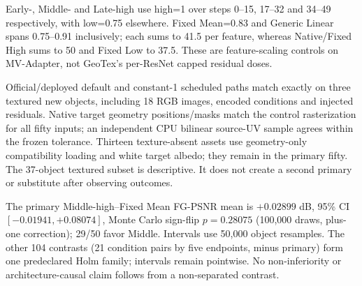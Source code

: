 \documentclass[11pt]{article}
\begin{document}
Early-, Middle- and Late-high use high=1 over steps 0--15, 17--32 and 34--49 respectively, with low=0.75 elsewhere. Fixed Mean=0.83 and Generic Linear spans 0.75--0.91 inclusively; each sums to 41.5 per feature, whereas Native/Fixed High sums to 50 and Fixed Low to 37.5. These are feature-scaling controls on MV-Adapter, not GeoTex's per-ResNet capped residual doses.

Official/deployed default and constant-1 scheduled paths match exactly on three textured new objects, including 18 RGB images, encoded conditions and injected residuals. Native target geometry positions/masks match the control rasterization for all fifty inputs; an independent CPU bilinear source-UV sample agrees within the frozen tolerance. Thirteen texture-absent assets use geometry-only compatibility loading and white target albedo; they remain in the primary fifty. The 37-object textured subset is descriptive. It does not create a second primary or substitute after observing outcomes.

The primary Middle-high--Fixed Mean FG-PSNR mean is $+0.02899$ dB, 95\% CI $[-0.01941,+0.08074]$, Monte Carlo sign-flip $p=0.28075$ (100,000 draws, plus-one correction); 29/50 favor Middle. Intervals use 50,000 object resamples. The other 104 contrasts (21 condition pairs by five endpoints, minus primary) form one predeclared Holm family; intervals remain pointwise. No non-inferiority or architecture-causal claim follows from a non-separated contrast.
\end{document}
